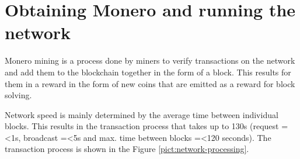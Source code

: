 \documentclass[
  printed, %
  table,   %
  nolof,     %
  nolot,     %
           oneside, color
]{fithesis3}
\begin{document}
\chapter{Obtaining Monero and running the network}
\label{cha:obtaining}
Monero mining is a process done by miners to verify transactions on the network and add them to the blockchain together in the form of a block. This results for them in a reward in the form of new coins that are emitted as a reward for block solving.

Network speed is mainly determined by the average time between individual blocks. %
This results in the transaction process that takes up to 130s (request =\textless 1s, broadcast =\textless 5s and max. time between blocks =\textless 120 seconds).  The transaction process is shown in the Figure \ref{pict:network-processing}.
\end{document}
